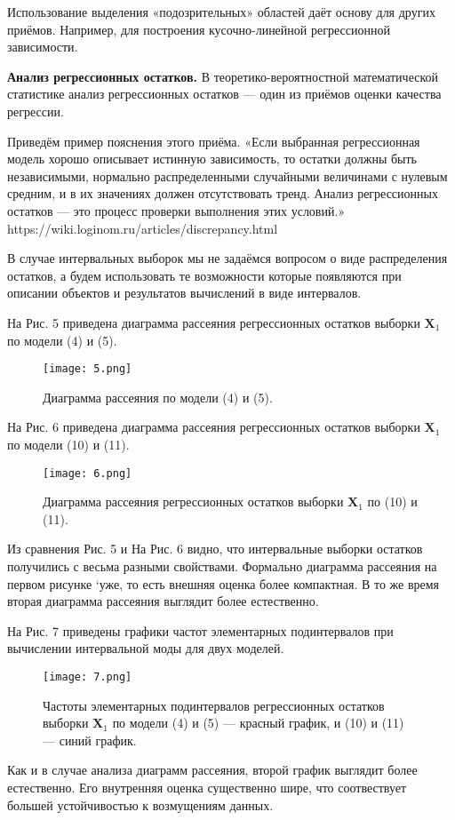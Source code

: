 \documentclass{article}
\begin{document}
	Использование выделения «подозрительных» областей даёт основу для других приёмов. Например, для построения кусочно-линейной регрессионной зависимости.
	
	\textbf{Анализ регрессионных остатков.} В теоретико-вероятностной математической статистике анализ регрессионных остатков — один из приёмов оценки качества регрессии.
	
	Приведём пример пояснения этого приёма. «Если выбранная регрессионная модель хорошо описывает истинную зависимость, то остатки должны быть независимыми, нормально распределенными случайными величинами с нулевым средним, и в
	их значениях должен отсутствовать тренд. Анализ регрессионных остатков — это процесс проверки выполнения этих условий.»
	https://wiki.loginom.ru/articles/discrepancy.html
	
	В случае интервальных выборок мы не задаёмся вопросом о виде
	распределения остатков, а будем использовать те возможности которые
	появляются при описании объектов и результатов вычислений в виде
	интервалов.
	
	На Рис. 5 приведена диаграмма рассеяния регрессионных остатков выборки $\textbf{X}_1$ по модели (4) и (5).
	\begin{figure}[H]
		\centering
		\texttt{[image: 5.png]}
		\caption{ Диаграмма рассеяния по модели (4) и (5).}
		\label{fig:five}
	\end{figure}
	На Рис. 6 приведена диаграмма рассеяния регрессионных остатков выборки $\textbf{X}_1$ по модели (10) и (11).
	\begin{figure}[H]
		\centering
		\texttt{[image: 6.png]}
		\caption{ Диаграмма рассеяния регрессионных остатков выборки $\textbf{X}_1$
			по (10) и (11).}
		\label{fig:six}
	\end{figure}
	Из сравнения Рис. 5 и На Рис. 6 видно, что интервальные выборки остатков получились с весьма разными свойствами. Формально диаграмма рассеяния на первом рисунке `уже, то есть внешняя оценка более компактная. В то же время вторая диаграмма рассеяния выглядит более естественно.
	
	На Рис. 7 приведены графики частот элементарных подинтервалов при вычислении интервальной моды для двух моделей.
	\begin{figure}[H]
		\centering
		\texttt{[image: 7.png]}
		\caption{ Частоты элементарных подинтервалов регрессионных
			остатков выборки $\textbf{X}_1$ по модели (4) и (5) — красный график, и
			(10) и (11) — синий график.}
		\label{fig:seven}
	\end{figure}
	Как и в случае анализа диаграмм рассеяния, второй график выглядит более естественно. Его внутренняя оценка существенно шире, что соотвествует большей устойчивостью к возмущениям данных.
	
\end{document}
